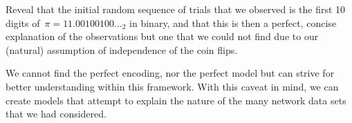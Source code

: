Reveal that the initial random sequence of trials that we observed is the first 10 digits of~$\pi = 11.00100100..._2$ in binary, and that this is then a perfect, concise explanation of the observations but one that we could not find due to our (natural) assumption of independence of the coin flips.

We cannot find the perfect encoding, nor the perfect model but can strive for better understanding within this framework.  With this caveat in mind, we can create models that attempt to explain the nature of the many network data sets that we had considered.